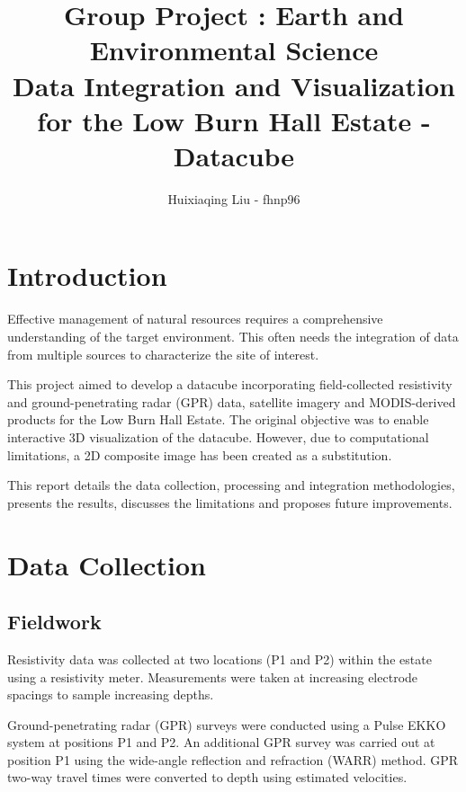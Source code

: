 \documentclass{article}
\begin{document}
\title{	\vspace{-1cm} \Large Group Project : Earth and Environmental Science \\ \vspace{0.2cm} \normalsize Data Integration and Visualization for the Low Burn Hall Estate - Datacube \vspace{-0.3cm}}
\author{ \normalsize Huixiaqing Liu - fhnp96}
\date{}
\maketitle

\section{Introduction}

Effective management of natural resources requires a comprehensive understanding of the target environment. This often needs the integration of data from multiple sources to characterize the site of interest.

This project aimed to develop a datacube incorporating field-collected resistivity and ground-penetrating radar (GPR) data, satellite imagery and MODIS-derived products for the Low Burn Hall Estate. The original objective was to enable interactive 3D visualization of the datacube. However, due to computational limitations, a 2D composite image has been created as a substitution.

This report details the data collection, processing and integration methodologies, presents the results, discusses the limitations and proposes future improvements.

\section{Data Collection}

\subsection{Fieldwork}

Resistivity data was collected at two locations (P1 and P2) within the estate using a resistivity meter. Measurements were taken at increasing electrode spacings to sample increasing depths.

Ground-penetrating radar (GPR) surveys were conducted using a Pulse EKKO system at positions P1 and P2. An additional GPR survey was carried out at position P1 using the wide-angle reflection and refraction (WARR) method. GPR two-way travel times were converted to depth using estimated velocities.
\end{document}
